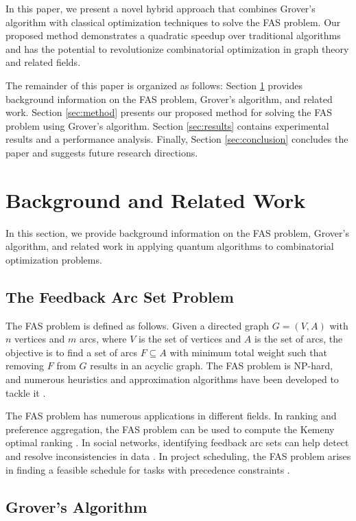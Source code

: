 In this paper, we present a novel hybrid approach that combines Grover's algorithm with classical optimization techniques to solve the FAS problem. Our proposed method demonstrates a quadratic speedup over traditional algorithms and has the potential to revolutionize combinatorial optimization in graph theory and related fields.

The remainder of this paper is organized as follows: Section \ref{sec:background} provides background information on the FAS problem, Grover's algorithm, and related work. Section \ref{sec:method} presents our proposed method for solving the FAS problem using Grover's algorithm. Section \ref{sec:results} contains experimental results and a performance analysis. Finally, Section \ref{sec:conclusion} concludes the paper and suggests future research directions.

\section{Background and Related Work}
\label{sec:background}

In this section, we provide background information on the FAS problem, Grover's algorithm, and related work in applying quantum algorithms to combinatorial optimization problems.

\subsection{The Feedback Arc Set Problem}

The FAS problem is defined as follows. Given a directed graph $G=(V, A)$ with $n$ vertices and $m$ arcs, where $V$ is the set of vertices and $A$ is the set of arcs, the objective is to find a set of arcs $F \subseteq A$ with minimum total weight such that removing $F$ from $G$ results in an acyclic graph. The FAS problem is NP-hard, and numerous heuristics and approximation algorithms have been developed to tackle it \cite{Ailon2008, Charbit2007}.

The FAS problem has numerous applications in different fields. In ranking and preference aggregation, the FAS problem can be used to compute the Kemeny optimal ranking \cite{Dwork2001}. In social networks, identifying feedback arc sets can help detect and resolve inconsistencies in data \cite{Eppstein1999}. In project scheduling, the FAS problem arises in finding a feasible schedule for tasks with precedence constraints \cite{Blazewicz1983}.

\subsection{Grover's Algorithm}

